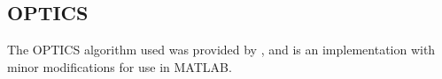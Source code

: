\subsection{OPTICS}
\label{subsec:ch6.section5.subsec3}

The \ac{OPTICS} algorithm used was provided by \cite{daszykowskiMatlabCodeOPTICS2002}, and is an implementation with minor modifications for use in MATLAB.

